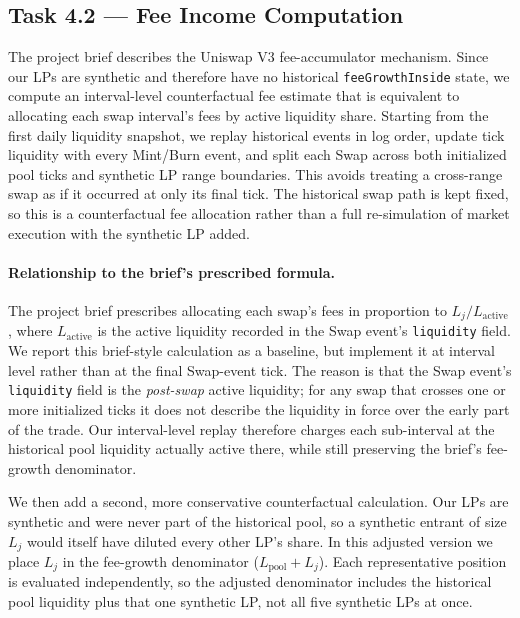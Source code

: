 \subsection{Task 4.2 --- Fee Income Computation}
\label{subsec:m4-task42}
The project brief describes the Uniswap V3 fee-accumulator mechanism. Since our
LPs are synthetic and therefore have no historical \texttt{feeGrowthInside}
state, we compute an interval-level counterfactual fee estimate that is
equivalent to allocating each swap interval's fees by active liquidity share.
Starting from the first daily liquidity snapshot, we replay historical events in
log order, update tick liquidity with every Mint/Burn event, and split each Swap
across both initialized pool ticks and synthetic LP range boundaries. This avoids
treating a cross-range swap as if it occurred at only its final tick. The
historical swap path is kept fixed, so this is a counterfactual fee allocation
rather than a full re-simulation of market execution with the synthetic LP added.

\paragraph{Relationship to the brief's prescribed formula.}
The project brief prescribes allocating each swap's fees in proportion to
$L_j/L_{\mathrm{active}}$, where $L_{\mathrm{active}}$ is the active liquidity
recorded in the Swap event's \texttt{liquidity} field.  We report this
brief-style calculation as a baseline, but implement it at interval level rather
than at the final Swap-event tick. The reason is that the Swap event's
\texttt{liquidity} field is the \emph{post-swap} active liquidity; for any swap
that crosses one or more initialized ticks it does not describe the liquidity in
force over the early part of the trade. Our interval-level replay therefore
charges each sub-interval at the historical pool liquidity actually active
there, while still preserving the brief's fee-growth denominator.

We then add a second, more conservative counterfactual calculation. Our LPs are
synthetic and were never part of the historical pool, so a synthetic entrant of
size $L_j$ would itself have diluted every other LP's share. In this adjusted
version we place $L_j$ in the fee-growth denominator
($L_{\mathrm{pool}}+L_j$). Each representative position is evaluated
independently, so the adjusted denominator includes the historical pool
liquidity plus that one synthetic LP, not all five synthetic LPs at once.

